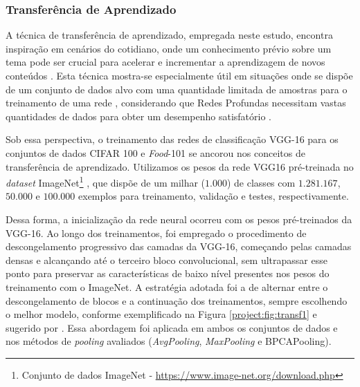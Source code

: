 \subsubsection{Transferência de Aprendizado}
\label{project:transf}
A técnica de transferência de aprendizado, empregada neste estudo, encontra inspiração em cenários do cotidiano, onde um conhecimento prévio sobre um tema pode ser crucial para acelerar e incrementar a aprendizagem de novos conteúdos \citep{Pan2010}. Esta técnica mostra-se especialmente útil em situações onde se dispõe de um conjunto de dados alvo com uma quantidade limitada de amostras para o treinamento de uma rede \citep{Weiss2016}, considerando que Redes Profundas necessitam vastas quantidades de dados para obter um desempenho satisfatório \citep{Goodfellow2016}.

Sob essa perspectiva, o treinamento das redes de classificação VGG-16 para os conjuntos de dados CIFAR 100 e \textit{Food}-101 se ancorou nos conceitos de transferência de aprendizado. Utilizamos os pesos da rede VGG16 pré-treinada no \textit{dataset} ImageNet\footnote{Conjunto de dados ImageNet - \url{https://www.image-net.org/download.php}} \citep{Deng2009ImageNet:Database}, que dispõe de um milhar ($1.000$) de classes com $1.281.167$, $50.000$ e $100.000$ exemplos para treinamento, validação e testes, respectivamente.

Dessa forma, a inicialização da rede neural ocorreu com os pesos pré-treinados da VGG-16. Ao longo dos treinamentos, foi empregado o procedimento de descongelamento progressivo das camadas da VGG-16, começando pelas camadas densas e alcançando até o terceiro bloco convolucional, sem ultrapassar esse ponto para preservar as características de baixo nível presentes nos pesos do treinamento com o ImageNet. A estratégia adotada foi a de alternar entre o descongelamento de blocos e a continuação dos treinamentos, sempre escolhendo o melhor modelo, conforme exemplificado na Figura \ref{project:fig:transf1} e sugerido por \cite{Chollet2021DeepPython}. Essa abordagem foi aplicada em ambos os conjuntos de dados e nos métodos de \textit{pooling} avaliados (\textit{AvgPooling}, \textit{MaxPooling} e BPCAPooling).

